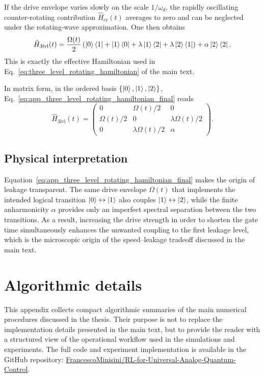 If the drive envelope varies slowly on the scale \(1/\omega_d\), the rapidly oscillating counter-rotating contribution \(\hat H_{\mathrm{cr}}(t)\) averages to zero and can be neglected under the rotating-wave approximation. One then obtains
\begin{equation}
\hat H_{\mathrm{3lvl}}(t)
=
\frac{\Omega(t)}{2}
\left(
\ket{0}\bra{1}+\ket{1}\bra{0}
+
\lambda\ket{1}\bra{2}+\lambda\ket{2}\bra{1}
\right)
+
\alpha\ket{2}\bra{2}.
\label{eq:app_three_level_rotating_hamiltonian_final}
\end{equation}
This is exactly the effective Hamiltonian used in Eq.~\eqref{eq:three_level_rotating_hamiltonian} of the main text.

In matrix form, in the ordered basis \(\{\ket{0},\ket{1},\ket{2}\}\), Eq.~\eqref{eq:app_three_level_rotating_hamiltonian_final} reads
\begin{equation}
\hat H_{\mathrm{3lvl}}(t)
=
\begin{pmatrix}
0 & \Omega(t)/2 & 0 \\
\Omega(t)/2 & 0 & \lambda\Omega(t)/2 \\
0 & \lambda\Omega(t)/2 & \alpha
\end{pmatrix}.
\label{eq:app_three_level_rotating_hamiltonian_matrix}
\end{equation}

\section{Physical interpretation}

Equation~\eqref{eq:app_three_level_rotating_hamiltonian_final} makes the origin of leakage transparent. The same drive envelope \(\Omega(t)\) that implements the intended logical transition \(\ket{0}\leftrightarrow\ket{1}\) also couples \(\ket{1}\leftrightarrow\ket{2}\), while the finite anharmonicity \(\alpha\) provides only an imperfect spectral separation between the two transitions. As a result, increasing the drive strength in order to shorten the gate time simultaneously enhances the unwanted coupling to the first leakage level, which is the microscopic origin of the speed--leakage tradeoff discussed in the main text.


\chapter{Algorithmic details}
\label{app:algorithmic_details}
This appendix collects compact algorithmic summaries of the main numerical procedures discussed in the thesis. Their purpose is not to replace the implementation details presented in the main text, but to provide the reader with a structured view of the operational workflow used in the simulations and experiments. The full code and experiment implementation is available in the GitHub repository: \href{https://github.com/FrancescoMinisini/RL-for-Universal-Analog-Quantum-Control-on-Gmon-Qubits}{FrancescoMinisini/RL-for-Universal-Analog-Quantum-Control}.


